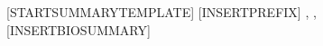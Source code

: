 [STARTSUMMARYTEMPLATE]
[INSERTPREFIX] \NameBoldface{[INSERTNAME]}, \NameBoldface{[INSERTROLE]}, [INSERTBIOSUMMARY] \par
[ENDSUMMARYTEMPLATE]
[INSERTSUMMARIES]
